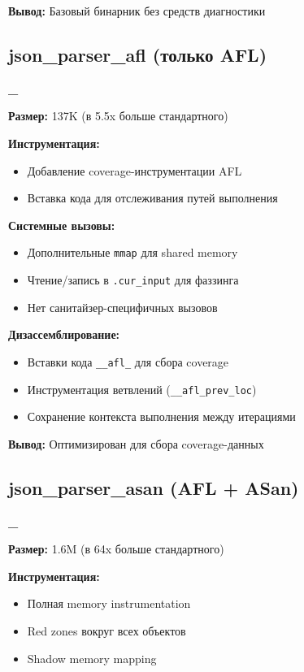  \textbf{Вывод:} Базовый бинарник без средств диагностики


\subsection{json\_parser\_afl (только AFL)}
\textbf{\_}


\textbf{Размер:} 137K (в 5.5x больше стандартного)

\textbf{Инструментация:}
  \begin{itemize}
  \item Добавление coverage-инструментации AFL
  \item Вставка кода для отслеживания путей выполнения
  \end{itemize}

\textbf{Системные вызовы:}
  \begin{itemize}
  \item Дополнительные \texttt{mmap} для shared memory
  \item Чтение/запись в \texttt{.cur\_input} для фаззинга
  \item Нет санитайзер-специфичных вызовов
  \end{itemize}

\textbf{Дизассемблирование:}
  \begin{itemize}
  \item Вставки кода \texttt{\_\_afl\_} для сбора coverage
  \item Инструментация ветвлений (\texttt{\_\_afl\_prev\_loc})
  \item Сохранение контекста выполнения между итерациями
  \end{itemize}

\textbf{Вывод:} Оптимизирован для сбора coverage-данных


\subsection{json\_parser\_asan (AFL + ASan)}
\textbf{\_}

\textbf{Размер:} 1.6M (в 64x больше стандартного)

\textbf{Инструментация:}
  \begin{itemize}
  \item Полная memory instrumentation
  \item Red zones вокруг всех объектов
  \item Shadow memory mapping
  \end{itemize}

